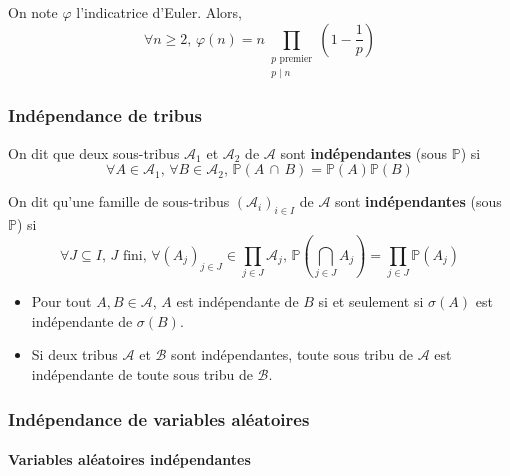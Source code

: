   \begin{application}
    On note $\varphi$ l'indicatrice d'Euler. Alors,
    \[ \forall n \geq 2, \, \varphi(n) = n \prod_{\substack{p \text{ premier} \\ p \mid n}} \left( 1 - \frac{1}{p} \right) \]
  \end{application}

  \subsubsection{Indépendance de tribus}


  \begin{definition}
    On dit que deux sous-tribus $\mathcal{A}_1$ et $\mathcal{A}_2$ de $\mathcal{A}$ sont \textbf{indépendantes} (sous $\mathbb{P}$) si
    \[ \forall A \in \mathcal{A}_1, \, \forall B \in \mathcal{A}_2, \, \mathbb{P}(A \, \cap \, B) = \mathbb{P}(A) \mathbb{P}(B) \]
  \end{definition}

  \begin{definition}
    On dit qu'une famille de sous-tribus $(\mathcal{A}_i)_{i \in I}$ de $\mathcal{A}$ sont \textbf{indépendantes} (sous $\mathbb{P}$) si
    \[ \forall J \subseteq I, \, J \text{ fini}, \, \forall (A_j)_{j \in J} \in \prod_{j \in J} \mathcal{A}_j, \, \mathbb{P}\left( \bigcap_{j \in J} A_j \right) = \prod_{j \in J} \mathbb{P}(A_j) \]
  \end{definition}

  \begin{remark}
    \begin{itemize}
      \item Pour tout $A, B \in \mathcal{A}$, $A$ est indépendante de $B$ si et seulement si $\sigma(A)$ est indépendante de $\sigma(B)$.
      \item Si deux tribus $\mathcal{A}$ et $\mathcal{B}$ sont indépendantes, toute sous tribu de $\mathcal{A}$ est indépendante de toute sous tribu de $\mathcal{B}$.
    \end{itemize}
  \end{remark}

  \subsubsection{Indépendance de variables aléatoires}

  \paragraph{Variables aléatoires indépendantes}

